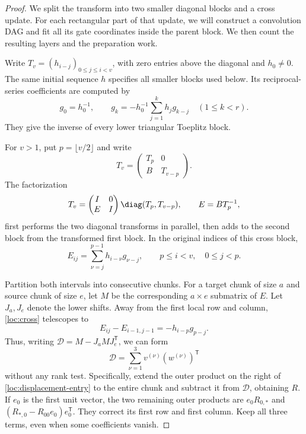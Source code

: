 \begin{proof}
We split the transform into two smaller diagonal blocks and a cross
update.  For each rectangular part of that update, we will construct a
convolution DAG and fit all its gate coordinates inside the parent
block.  We then count the resulting layers and the preparation work.

Write $T_v=(h_{i-j})_{0\le j\le i<v}$, with zero entries above the
diagonal and $h_0\ne0$.  The same initial sequence $h$ specifies all
smaller blocks used below.  Its reciprocal-series coefficients are
computed by
\begin{equation}\label{loc:reciprocal}
 g_0=h_0^{-1},\qquad
 g_k=-h_0^{-1}\sum_{j=1}^k h_jg_{k-j}\quad(1\le k<r).
\end{equation}
They give the inverse of every lower triangular Toeplitz block.

For $v>1$, put $p=\lfloor v/2\rfloor$ and write
\[
 T_v=\begin{pmatrix}T_p&0\\B&T_{v-p}\end{pmatrix}.
\]
The factorization
\[
 T_v=\begin{pmatrix}I&0\\E&I\end{pmatrix}
      \diag(T_p,T_{v-p}),\qquad E=BT_p^{-1},
\]
first performs the two diagonal transforms in parallel, then adds to
the second block from the transformed first block.  In the original
indices of this cross block,
\begin{equation}\label{loc:cross}
 E_{ij}=\sum_{\nu=j}^{p-1}h_{i-\nu}g_{\nu-j},
 \qquad p\le i<v,\quad 0\le j<p.
\end{equation}

Partition both intervals into consecutive chunks.  For a target chunk
of size $a$ and source chunk of size $e$, let $M$ be the corresponding
$a\times e$ submatrix of $E$.  Let $J_a,J_e$ denote the lower shifts.
Away from the first local row and column, \eqref{loc:cross} telescopes
to
\begin{equation}\label{loc:displacement-entry}
 E_{ij}-E_{i-1,j-1}=-h_{i-p}g_{p-j}.
\end{equation}
Thus, writing $\mathcal D=M-J_aMJ_e^{\mathsf T}$, we can form
\begin{equation}\label{loc:displacement}
 \mathcal D=\sum_{\nu=1}^3 v^{(\nu)}(w^{(\nu)})^{\mathsf T}
\end{equation}
without any rank test.  Specifically, extend the outer product on the
right of \eqref{loc:displacement-entry} to the entire chunk and subtract
it from $\mathcal D$, obtaining $R$.  If $e_0$ is the first unit vector,
the two remaining outer products are
$e_0R_{0,*}$ and $(R_{*,0}-R_{00}e_0)e_0^{\mathsf T}$.
They correct its first row and first column.  Keep all three terms,
even when some coefficients vanish.


\end{proof}
